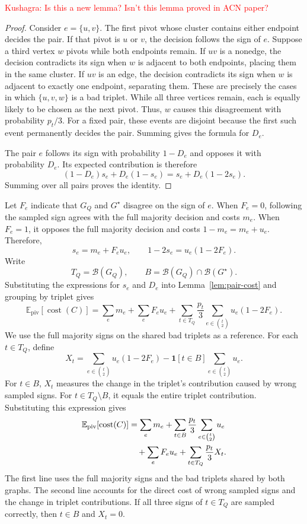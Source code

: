 \documentclass[11pt]{article}
\theoremstyle{definition}
\theoremstyle{remark}
\newcommand{\1}{\mathbf{1}}
\newcommand{\kushagra}[1]{\textcolor{red}{\newline Kushagra: #1}}
\begin{document}
\kushagra{Is this a new lemma? Isn't this lemma proved in ACN paper?}

\begin{proof}
Consider $e=\{u,v\}$. The first pivot whose cluster contains
either endpoint decides the pair.
If that pivot is $u$ or $v$, the decision follows the sign of $e$.
Suppose a third vertex $w$ pivots while both endpoints remain.
If $uv$ is a nonedge, the decision contradicts its sign when
$w$ is adjacent to both endpoints, placing them in the same cluster. If $uv$ is an edge, the decision contradicts its sign when
$w$ is adjacent to exactly one endpoint, separating them.
These are precisely the cases in which $\{u,v,w\}$ is a bad
triplet. While all three vertices remain, each is equally likely
to be chosen as the next pivot. Thus, $w$ causes this disagreement
with probability $p_t/3$.
For a fixed pair, these events are disjoint because the first
such event permanently decides the pair. Summing gives the formula
for $D_e$.

The pair $e$ follows its sign
with probability $1-D_e$ and opposes it with probability $D_e$.
Its expected contribution is therefore
\[
    (1-D_e)s_e+D_e(1-s_e)
    =s_e+D_e(1-2s_e).
\]
Summing over all pairs proves the identity.
\end{proof}

Let $F_e$ indicate that $G_Q$ and $G^\star$ disagree on the
sign of $e$. When $F_e=0$, following the sampled sign agrees
with the full majority decision and costs $m_e$. When $F_e=1$,
it opposes the full majority decision and costs $1-m_e=m_e+u_e$.
Therefore,
\[
    s_e=m_e+F_eu_e,
    \qquad
    1-2s_e=u_e(1-2F_e).
\]
Write
\[
    T_Q=\mathcal B(G_Q),
    \qquad
    B=\mathcal B(G_Q)\cap\mathcal B(G^\star).
\]
Substituting the expressions for $s_e$ and $D_e$ into
Lemma~\ref{lem:pair-cost} and grouping by triplet gives
\[
    \mathbb E_{\mathrm{piv}}[\operatorname{cost}(C)]
        =\sum_e m_e+\sum_e F_eu_e
         +\sum_{t\in T_Q}\frac{p_t}{3}
             \sum_{e\in\binom{t}{2}}u_e(1-2F_e).
\]
We use the full majority signs on the shared bad triplets as
a reference. For each $t\in T_Q$, define
\[
    X_t=
        \sum_{e\in\binom{t}{2}}u_e(1-2F_e)
        -\mathbf 1[t\in B]
            \sum_{e\in\binom{t}{2}}u_e.
\]
For $t\in B$, $X_t$ measures the change in the triplet's
contribution caused by wrong sampled signs. For
$t\in T_Q\setminus B$, it equals the entire triplet contribution.
Substituting this expression gives
\begin{align}
    \mathbb E_{\mathrm{piv}}[\operatorname{cost}(C)]
        &=\sum_e m_e
          +\sum_{t\in B}\frac{p_t}{3}
              \sum_{e\in\binom{t}{2}}u_e \notag\\
        &\quad+\sum_e F_eu_e
          +\sum_{t\in T_Q}\frac{p_t}{3}X_t.
    \label{eq:offline-decomposition}
\end{align}
The first line uses the full majority signs and the bad
triplets shared by both graphs. The second line accounts for
the direct cost of wrong sampled signs and the change in
triplet contributions. If all three signs of $t\in T_Q$ are
sampled correctly, then $t\in B$ and $X_t=0$.
\end{document}
